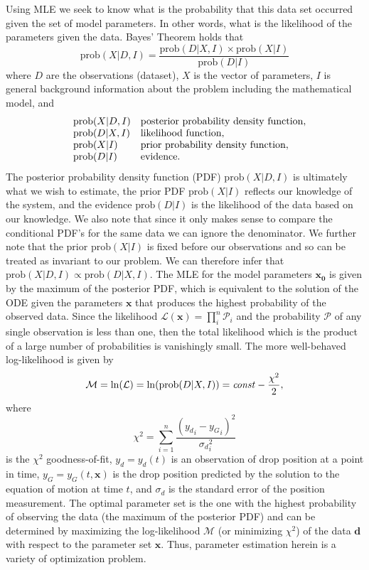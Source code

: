 \documentclass[12pt,a4paper,oneside]{book}
\begin{document}
Using MLE we seek to know what is the probability that this data set occurred given the set of model parameters. In other words, what is the likelihood of the parameters given the data. Bayes' Theorem holds that
\[\mbox{prob}(X|D, I) = \frac{\mbox{prob}(D|X,I) \times \mbox{prob}(X|I)}{\mbox{prob}(D|I)}\]
where $D$ are the observations (dataset), $X$ is the vector of parameters, $I$ is general background information about the problem including the mathematical model, and 
\[\begin{array}{lll}
& \centering \mbox{prob}(X|D, I) & \mbox{posterior probability density function},\\
& \centering \mbox{prob}(D|X, I) & \mbox{likelihood function},\\
& \centering \mbox{prob}(X|I) &  \mbox{prior probability density function},\\
& \centering \mbox{prob}(D|I) &  \mbox{evidence}.
\end{array}
\]
The posterior probability density function (PDF) $\mbox{prob}(X|D, I)$ is ultimately what we wish to estimate, the prior PDF $\mbox{prob}(X|I)$ reflects our knowledge of the system, and the evidence $\mbox{prob}(D|I)$ is the likelihood of the data based on our knowledge. We also note that since it only makes sense to compare the conditional PDF's for the same data we can ignore the denominator. We further note that the prior $\mbox{prob}(X|I)$ is fixed before our observations and so can be treated as invariant to our problem. We can therefore infer that $\mbox{prob}(X|D, I) \propto \mbox{prob}(D|X, I)$. The MLE for the model parameters $\mathbf{x_0}$ is given by the maximum of the posterior PDF, which is equivalent to the solution of the ODE given the parameters $\mathbf{x}$ that produces the highest probability of the observed data. Since the likelihood $\mathcal{L}(\mathbf{x}) = \prod_i^n \mathcal{P}_i$ and the probability $\mathcal{P}$ of any single observation is less than one, then the total likelihood which is the product of a large number of probabilities is vanishingly small. The more well-behaved log-likelihood is given by
\[\mathcal{M} = \ln(\mathcal{L}) = \ln(\mbox{prob}(D|X, I)) = \mbox{\emph{const}} - \frac{\chi^2}{2},\]
where 
\[
\chi^2 = \sum^n_{i=1} \frac{\left({y_d}_i - {y_G}_i \right)^2}{{\sigma_d}_i^2}
\]
is the $\chi^2$ goodness-of-fit, $y_d = y_d(t)$ is an observation of drop position at a point in time, $y_G =  y_G(t, \mathbf{x})$ is the drop position predicted by the solution to the equation of motion at time $t$, and $\sigma_d$ is the standard error of the position measurement. The optimal parameter set is the one with the highest probability of observing the data (the maximum of the posterior PDF) and can be determined by maximizing the log-likelihood $\mathcal{M}$ (or minimizing $\chi^2$) of the data $\mathbf{d}$ with respect to the parameter set $\mathbf{x}$. Thus, parameter estimation herein is a variety of optimization problem. 
\end{document}
